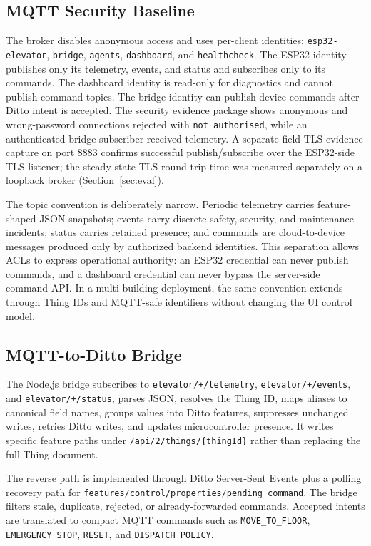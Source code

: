 \documentclass[journal]{IEEEtran}
\newcommand{\artifact}[1]{\texttt{#1}}
\begin{document}
\subsection{MQTT Security Baseline}

The broker disables anonymous access and uses per-client identities: \artifact{esp32-elevator}, \artifact{bridge}, \artifact{agents}, \artifact{dashboard}, and \artifact{healthcheck}. The ESP32 identity publishes only its telemetry, events, and status and subscribes only to its commands. The dashboard identity is read-only for diagnostics and cannot publish command topics. The bridge identity can publish device commands after Ditto intent is accepted. The security evidence package shows anonymous and wrong-password connections rejected with \artifact{not authorised}, while an authenticated bridge subscriber received telemetry. A separate field TLS evidence capture on port 8883 confirms successful publish/subscribe over the ESP32-side TLS listener; the steady-state TLS round-trip time was measured separately on a loopback broker (Section~\ref{sec:eval}).

The topic convention is deliberately narrow. Periodic telemetry carries feature-shaped JSON snapshots; events carry discrete safety, security, and maintenance incidents; status carries retained presence; and commands are cloud-to-device messages produced only by authorized backend identities. This separation allows ACLs to express operational authority: an ESP32 credential can never publish commands, and a dashboard credential can never bypass the server-side command API. In a multi-building deployment, the same convention extends through Thing IDs and MQTT-safe identifiers without changing the UI control model.

\subsection{MQTT-to-Ditto Bridge}

The Node.js bridge subscribes to \artifact{elevator/+/telemetry}, \artifact{elevator/+/events}, and \artifact{elevator/+/status}, parses JSON, resolves the Thing ID, maps aliases to canonical field names, groups values into Ditto features, suppresses unchanged writes, retries Ditto writes, and updates microcontroller presence. It writes specific feature paths under \artifact{/api/2/things/\{thingId\}} rather than replacing the full Thing document.

The reverse path is implemented through Ditto Server-Sent Events plus a polling recovery path for \artifact{features/control/properties/pending\_command}. The bridge filters stale, duplicate, rejected, or already-forwarded commands. Accepted intents are translated to compact MQTT commands such as \artifact{MOVE\_TO\_FLOOR}, \artifact{EMERGENCY\_STOP}, \artifact{RESET}, and \artifact{DISPATCH\_POLICY}.
\end{document}
